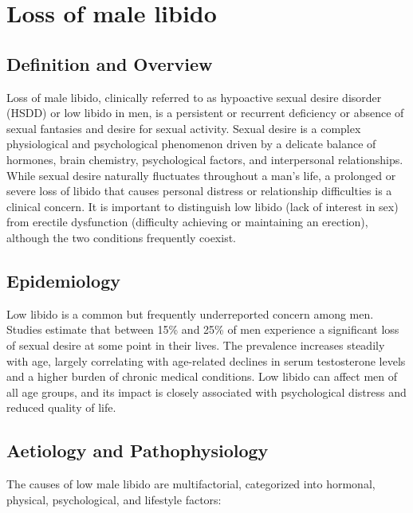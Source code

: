 \chapter{Loss of male libido}

\section*{Definition and Overview}
Loss of male libido, clinically referred to as hypoactive sexual desire disorder (HSDD) or low libido in men, is a persistent or recurrent deficiency or absence of sexual fantasies and desire for sexual activity. Sexual desire is a complex physiological and psychological phenomenon driven by a delicate balance of hormones, brain chemistry, psychological factors, and interpersonal relationships. While sexual desire naturally fluctuates throughout a man's life, a prolonged or severe loss of libido that causes personal distress or relationship difficulties is a clinical concern. It is important to distinguish low libido (lack of interest in sex) from erectile dysfunction (difficulty achieving or maintaining an erection), although the two conditions frequently coexist.

\section*{Epidemiology}
Low libido is a common but frequently underreported concern among men. Studies estimate that between 15\% and 25\% of men experience a significant loss of sexual desire at some point in their lives. The prevalence increases steadily with age, largely correlating with age-related declines in serum testosterone levels and a higher burden of chronic medical conditions. Low libido can affect men of all age groups, and its impact is closely associated with psychological distress and reduced quality of life.

\section*{Aetiology and Pathophysiology}
The causes of low male libido are multifactorial, categorized into hormonal, physical, psychological, and lifestyle factors:

